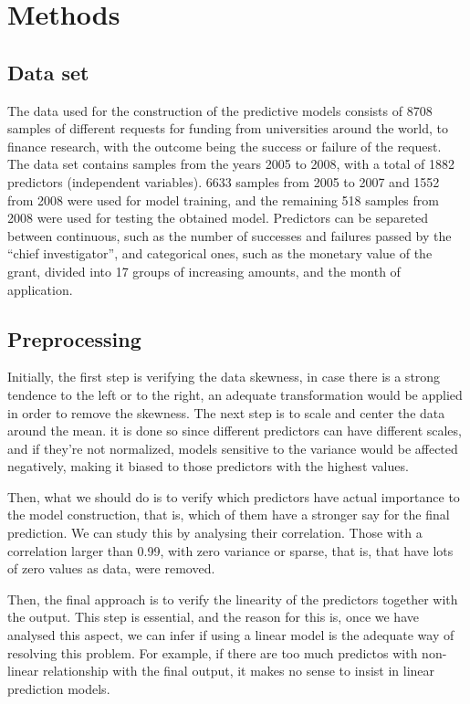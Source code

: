 
\section{Methods}

\subsection{Data set}

The data used for the construction of the predictive models consists of 8708 samples
of different requests for funding from universities around the world, to finance research,
with the outcome being the success or failure of the request. The data set contains samples
from the years 2005 to 2008, with a total of 1882 predictors (independent variables). 
6633 samples from 2005 to 2007 and 1552 from 2008 were used for model training, and the 
remaining 518 samples from 2008 were used for testing the obtained model. Predictors can be 
separeted between continuous, such as the number of successes and failures passed by the 
``chief investigator'', and categorical ones, such as the monetary value of the grant, 
divided into 17 groups of increasing amounts, and the month of application.

\subsection{Preprocessing}

Initially, the first step is verifying the data skewness, in case there is a strong 
tendence to the left or to the right, an adequate transformation would be applied in order to 
remove the skewness. The next step is to scale and center the data around the mean. it is 
done so since different predictors can have different scales, and if they're not normalized,
models sensitive to the variance would be affected negatively, making it biased to those
predictors with the highest values. 

Then, what we should do is to verify which predictors have actual importance to the model 
construction, that is, which of them have a stronger say for the final prediction. We can 
study this by analysing their correlation. Those with a correlation larger than 0.99, with
zero variance or sparse, that is, that have lots of zero values as data, were removed.

Then, the final approach is to verify the linearity of the predictors together with the output. 
This step is essential, and the reason for this is, once we have analysed this aspect, we can
infer if using a linear model is the adequate way of resolving this problem. For example, 
if there are too much predictos with non-linear relationship with the final output, it makes no 
sense to insist in linear prediction models.

